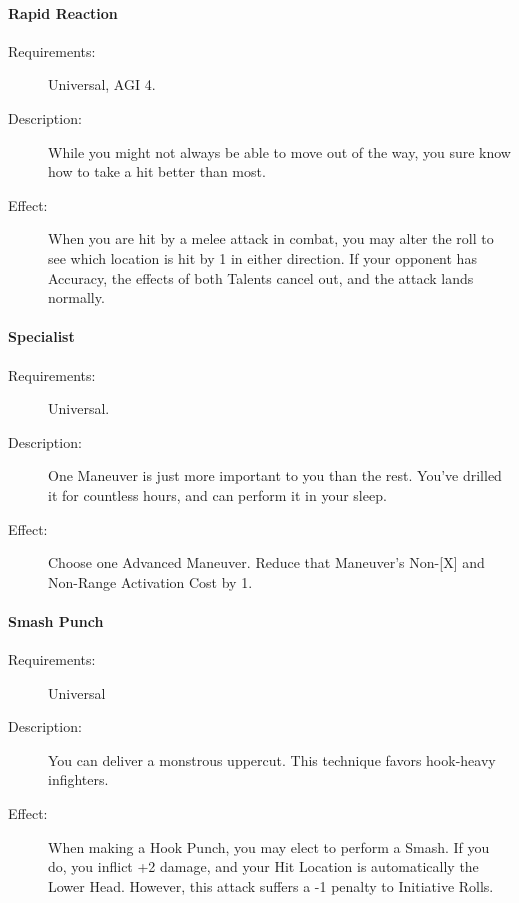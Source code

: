 \documentclass[oneside,11pt,english]{book}
\begin{document}
\paragraph{\label{talent:Rapid Reaction}Rapid Reaction}
\begin{description}
	\item [Requirements:] Universal, AGI 4. 
	\item [Description:] While you might not always be able to move out of the way, you sure know how to take a hit better than most. 
	\item [Effect:] When you are hit by a melee attack in combat, you may alter the roll to see which location is hit by 1 in either direction. If your opponent has Accuracy, the effects of both Talents cancel out, and the 
	attack lands normally. 
	
	
\end{description}
\paragraph{Specialist}\label{talent:Specialist}
\begin{description}
	\item [Requirements:] Universal.
	\item [Description:] One Maneuver is just more important to you than the rest. You’ve drilled it for countless hours, and can perform it in your sleep. 
	\item [Effect:] Choose one Advanced Maneuver. Reduce that Maneuver’s Non-[X] and Non-Range Activation Cost by 1.
\end{description}
\paragraph{Smash Punch}\label{talent:Smash Punch}
\begin{description}
	\item [Requirements:] Universal 
	\item [Description:] You can deliver a monstrous uppercut. This technique favors hook-heavy infighters. 
	\item [Effect:] When making a Hook Punch, you may elect to perform a Smash. If you do, you inflict +2 
	damage, and your Hit Location is automatically the Lower Head. However, this attack suffers a -1 penalty 
	to Initiative Rolls. 
\end{description}
\end{document}
